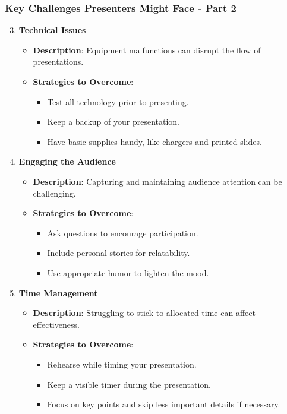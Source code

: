 \documentclass[aspectratio=169]{beamer}
\begin{document}
\begin{frame}[fragile]
    \frametitle{Key Challenges Presenters Might Face - Part 2}
    \begin{enumerate}
        \setcounter{enumi}{2} %
        \item \textbf{Technical Issues}
            \begin{itemize}
                \item \textbf{Description}: Equipment malfunctions can disrupt the flow of presentations.
                \item \textbf{Strategies to Overcome}:
                    \begin{itemize}
                        \item Test all technology prior to presenting.
                        \item Keep a backup of your presentation.
                        \item Have basic supplies handy, like chargers and printed slides.
                    \end{itemize}
            \end{itemize}

        \item \textbf{Engaging the Audience}
            \begin{itemize}
                \item \textbf{Description}: Capturing and maintaining audience attention can be challenging.
                \item \textbf{Strategies to Overcome}:
                    \begin{itemize}
                        \item Ask questions to encourage participation.
                        \item Include personal stories for relatability.
                        \item Use appropriate humor to lighten the mood.
                    \end{itemize}
            \end{itemize}
        
        \item \textbf{Time Management}
            \begin{itemize}
                \item \textbf{Description}: Struggling to stick to allocated time can affect effectiveness.
                \item \textbf{Strategies to Overcome}:
                    \begin{itemize}
                        \item Rehearse while timing your presentation.
                        \item Keep a visible timer during the presentation.
                        \item Focus on key points and skip less important details if necessary.
                    \end{itemize}
            \end{itemize}
    \end{enumerate}
\end{frame}
\end{document}
